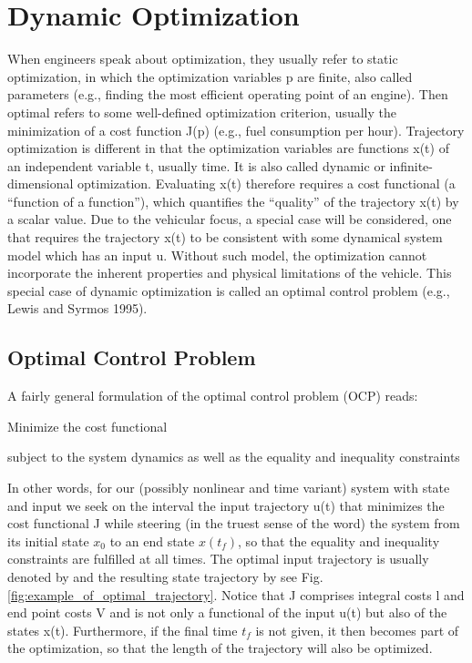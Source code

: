 \section{Dynamic Optimization}\label{DO}

When engineers speak about optimization, they usually refer to static optimization, in which the optimization variables p are finite, also called parameters (e.g., finding the most efficient operating point of an engine). Then optimal refers to some well-defined optimization criterion, usually the minimization of a cost function J(p) (e.g., fuel consumption per hour). 
Trajectory optimization is different in that the optimization variables are functions x(t) of an independent variable t, usually time. It is also called dynamic or infinite-dimensional optimization. Evaluating x(t) therefore requires a cost functional (a “function of a function”), which quantifies the “quality” of the trajectory x(t) by a scalar value. 
Due to the vehicular focus, a special case will be considered, one that requires the trajectory x(t) to be consistent with some dynamical system model which has an input u. Without such model, the optimization cannot incorporate the inherent properties and physical limitations of the vehicle. This special case of dynamic optimization is called an optimal control problem (e.g., Lewis and Syrmos 1995).

\subsection{Optimal Control Problem}
A fairly general formulation of the optimal control problem (OCP) reads:


Minimize the cost functional

subject to the system dynamics
as well as the equality and inequality constraints


In other words, for our (possibly nonlinear and time variant) system with state %
and input %
we seek on the interval %
the input trajectory u(t) that minimizes the cost functional J while steering (in the truest sense of the word) the system from its initial state $x_0$ to an end state $x(t_f )$, so that the equality and inequality constraints are fulfilled at all times. The optimal input trajectory is usually denoted by 
and the resulting state trajectory by %
see Fig. \ref{fig:example_of_optimal_trajectory}. Notice that J comprises integral costs l and end point costs V and is not only a functional of the input u(t) but also of the states x(t). Furthermore, if the final time $t_f$ is not given, it then becomes part of the optimization, so that the length of the trajectory will also be optimized.

